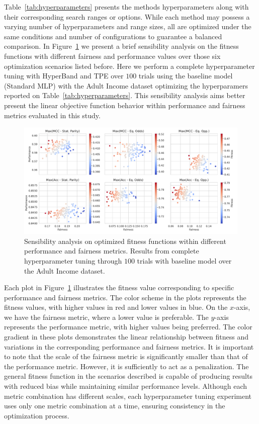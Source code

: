 Table~\ref{tab:hyperparameters} presents the methods hyperparameters along with their corresponding search ranges or options. While each method may possess a varying number of hyperparameters and range sizes, all are optimized under the same conditions and number of configurations to guarantee a balanced comparison. In Figure~\ref{fig:fitness_sensibility} we present a brief sensibility analysis on the fitness functions with different fairness and performance values over those six optimization scenarios listed before. Here we perform a complete hyperparameter tuning with HyperBand and TPE over $100$ trials using the baseline model (Standard MLP) with the Adult Income dataset optimizing the hyperparamers reported on Table~\ref{tab:hyperparameters}. This sensibility analysis aims better present the linear objective function behavior within performance and fairness metrics evaluated in this study.

\begin{figure}[!ht]
\centering
\caption{Sensibility analysis on optimized fitness functions within different performance and fairness metrics. Results from complete hyperparameter tuning through $100$ trials with baseline model over the Adult Income dataset.}
    \label{fig:fitness_sensibility}
    \includegraphics[width=1\linewidth]{images/fitness_sensibility.pdf}
\end{figure}

Each plot in Figure~\ref{fig:fitness_sensibility} illustrates the fitness value corresponding to specific performance and fairness metrics. The color scheme in the plots represents the fitness values, with higher values in red and lower values in blue. On the $x$-axis, we have the fairness metric, where a lower value is preferable. The $y$-axis represents the performance metric, with higher values being preferred. The color gradient in these plots demonstrates the linear relationship between fitness and variations in the corresponding performance and fairness metrics. It is important to note that the scale of the fairness metric is significantly smaller than that of the performance metric. However, it is sufficiently to act as a penalization. The general fitness function in the scenarios described is capable of producing results with reduced bias while maintaining similar performance levels. Although each metric combination has different scales, each hyperparameter tuning experiment uses only one metric combination at a time, ensuring consistency in the optimization process.

